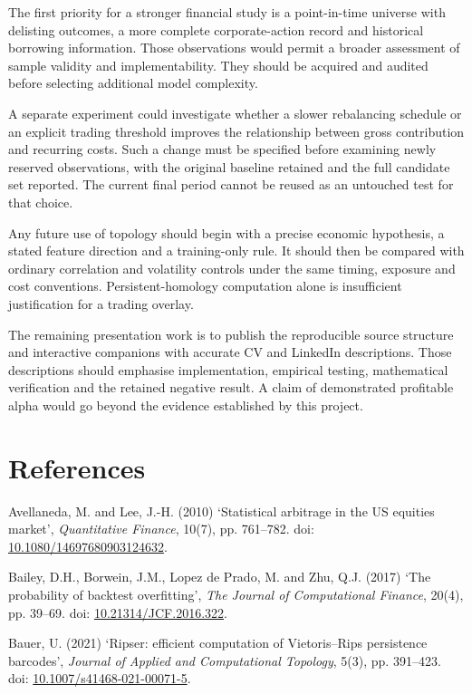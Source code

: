 \documentclass[12pt,a4paper,oneside]{article}
\newcommand{\refentry}[1]{\par\begingroup\hangindent=7mm\hangafter=1 #1\par\endgroup\vspace{4pt}}
\begin{document}
The first priority for a stronger financial study is a point-in-time universe with delisting outcomes, a more complete corporate-action record and historical borrowing information. Those observations would permit a broader assessment of sample validity and implementability. They should be acquired and audited before selecting additional model complexity.


A separate experiment could investigate whether a slower rebalancing schedule or an explicit trading threshold improves the relationship between gross contribution and recurring costs. Such a change must be specified before examining newly reserved observations, with the original baseline retained and the full candidate set reported. The current final period cannot be reused as an untouched test for that choice.


Any future use of topology should begin with a precise economic hypothesis, a stated feature direction and a training-only rule. It should then be compared with ordinary correlation and volatility controls under the same timing, exposure and cost conventions. Persistent-homology computation alone is insufficient justification for a trading overlay.


The remaining presentation work is to publish the reproducible source structure and interactive companions with accurate CV and LinkedIn descriptions. Those descriptions should emphasise implementation, empirical testing, mathematical verification and the retained negative result. A claim of demonstrated profitable alpha would go beyond the evidence established by this project.
\FloatBarrier\clearpage{}\section*{References}
\begingroup{}\fontsize{10.5}{13.5}\selectfont
\refentry{Avellaneda, M. and Lee, J.-H. (2010) ‘Statistical arbitrage in the US equities market’, \textit{Quantitative Finance}, 10(7), pp. 761–782. doi: \href{https://doi.org/10.1080/14697680903124632}{10.1080/14697680903124632}.}

\refentry{Bailey, D.H., Borwein, J.M., Lopez de Prado, M. and Zhu, Q.J. (2017) ‘The probability of backtest overfitting’, \textit{The Journal of Computational Finance}, 20(4), pp. 39–69. doi: \href{https://doi.org/10.21314/JCF.2016.322}{10.21314/JCF.2016.322}.}

\refentry{Bauer, U. (2021) ‘Ripser: efficient computation of Vietoris–Rips persistence barcodes’, \textit{Journal of Applied and Computational Topology}, 5(3), pp. 391–423. doi: \href{https://doi.org/10.1007/s41468-021-00071-5}{10.1007/s41468-021-00071-5}.}
\end{document}
